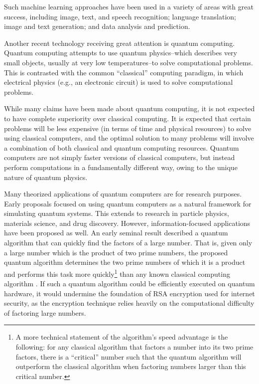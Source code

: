\documentclass[%
 reprint,
nofootinbib,
 amsmath,amssymb,
 aps,
]{revtex4-2}
\begin{document}
Such machine learning approaches have been used in a variety of areas with great success, including image, text, and speech recognition; language translation; image and text generation; and data analysis and prediction.

Another recent technology receiving great attention is quantum computing. Quantum computing attempts to use quantum physics--which describes very small objects, usually at very low temperatures--to solve computational problems. This is contrasted with the common ``classical'' computing paradigm, in which electrical physics (e.g., an electronic circuit) is used to solve computational problems.

While many claims have been made about quantum computing, it is not expected to have complete superiority over classical computing. It is expected that 
certain problems will be less expensive (in terms of time and physical resources) to solve using classical computers, and the optimal solution to many problems will involve a combination of both classical and quantum computing resources. Quantum computers are not simply faster versions of classical computers, but instead perform computations in a fundamentally different way, owing to the unique nature of quantum physics. 


Many theorized applications of quantum computers are for research purposes. Early proposals focused on using quantum computers as a natural framework for simulating quantum systems. This extends to research in particle physics, materials science, and drug discovery. However, information-focused applications have been proposed as well. An early seminal result described a quantum algorithm that can quickly find the factors of a large number. 
That is, given only a large number which is the product of two prime numbers, the proposed quantum algorithm determines the two prime numbers of which it is a product and performs this task more quickly\footnote{A more technical statement of the algorithm's speed advantage is the following: for any classical algorithm that factors a number into its two prime factors, there is a ``critical'' number such that the quantum algorithm will outperform the classical algorithm when factoring numbers larger than this critical number.} than any known classical computing algorithm \cite{shor_polynomial-time_1997}. If such a quantum algorithm could be efficiently executed on quantum hardware, it would undermine the foundation of RSA encryption used for internet security, as the encryption technique relies heavily on the computational difficulty of factoring large numbers.
\end{document}
